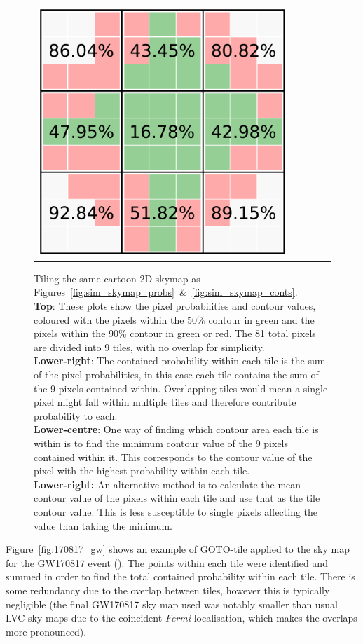 \begin{colsection}
\begin{colsection}
\begin{figure}[p]
\begin{center}
\begin{tabular}{cccccc}
\multicolumn{2}{c}{\includegraphics[width=0.3\linewidth]{images/sim/sim_skymap_tile_meanconts.pdf}}
\\
\end{tabular}
\end{center}

\caption[Calculating tile probabilities and contours for a 2D skymap]{Tiling the same cartoon 2D skymap as Figures~\ref{fig:sim_skymap_probs}~\&~\ref{fig:sim_skymap_conts}.\\
\textbf{Top}: These plots show the pixel probabilities and contour values, coloured with the pixels within the 50\% contour in green and the pixels within the 90\% contour in green or red. The 81 total pixels are divided into 9 tiles, with no overlap for simplicity.\\
\textbf{Lower-right}: The contained probability within each tile is the sum of the pixel probabilities, in this case each tile contains the sum of the 9 pixels contained within. Overlapping tiles would mean a single pixel might fall within multiple tiles and therefore contribute probability to each.\\
\textbf{Lower-centre}: One way of finding which contour area each tile is within is to find the minimum contour value of the 9 pixels contained within it. This corresponds to the contour value of the pixel with the highest probability within each tile.\\
\textbf{Lower-right:} An alternative method is to calculate the mean contour value of the pixels within each tile and use that as the tile contour value. This is less susceptible to single pixels affecting the value than taking the minimum.
}
\label{fig:sim_skymap_tiles}
\end{figure}


\clearpage

Figure~\ref{fig:170817_gw} shows an example of GOTO-tile applied to the sky map for the GW170817 event (\cite{GW170817}). The points within each tile were identified and summed in order to find the total contained probability within each tile. There is some redundancy due to the overlap between tiles, however this is typically negligible (the final GW170817 sky map used was notably smaller than usual LVC sky maps due to the coincident \textit{Fermi} localisation, which makes the overlaps more pronounced).


\end{colsection}
\end{colsection}
